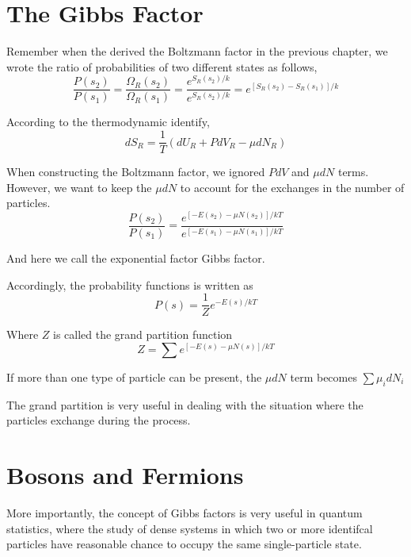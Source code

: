 


\section{The Gibbs Factor}
Remember when the derived the Boltzmann factor in the previous chapter, we wrote the ratio of probabilities of 
two different states as follows,
\begin{equation} 
\frac{P(s_2)}{P(s_1)} = \frac{\Omega_R(s_2)}{\Omega_R(s_1)} 
                      = \frac{e^{S_R(s_2)/k}}{e^{S_R(s_2)/k}}
                      = e^{[S_R(s_2)-S_R(s_1)]/k}
\end{equation}

According to the thermodynamic identify,
\begin{equation}
dS_R = \frac{1}{T} (dU_R + PdV_R - \mu dN_R) 
\end{equation}

When constructing the Boltzmann factor, we ignored $PdV$ and $\mu dN$ terms. However, we want to keep the  $\mu dN$ to account
for the exchanges in the number of particles. 
\begin{equation}
\frac{P(s_2)}{P(s_1)} = \frac{e^{[-E(s_2)-\mu N(s_2)]/kT}}{e^{[-E(s_1)-\mu N(s_1)]/kT}}
\end{equation}

And here we call the exponential factor Gibbs factor.

Accordingly, the probability functions is written as
\begin{equation}
P(s) = \frac{1}{Z}e^{-E(s)/kT}
\end{equation}

Where $Z$ is called the grand partition function
\begin{equation}
Z = \sum e^{[-E(s)-\mu N(s)]/kT}
\end{equation}

If more than one type of particle can be present, the $\mu dN$ term becomes $\sum {\mu_i dN_i}$

The grand partition is very useful in dealing with the situation where the particles exchange during the process.


\section{Bosons and Fermions}
More importantly, the concept of Gibbs factors is very useful in quantum statistics, where the study of dense systems in which two
or more identifcal particles have reasonable chance to occupy the same single-particle state.

